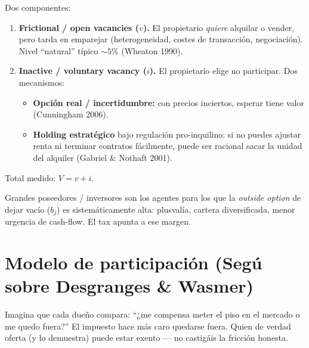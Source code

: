 \documentclass[11pt,a4paper]{report}
\begin{document}
\begin{modelo}[title={Modelo (versi\'on sencilla) --- Seg\'u / Wheaton}]
Dos componentes:
\begin{enumerate}
  \item \textbf{Frictional / open vacancies ($v$).}
        El propietario \emph{quiere} alquilar o vender, pero tarda en emparejar
        (heterogeneidad, costes de transacci\'on, negociaci\'on). Nivel ``natural''
        t\'ipico $\sim 5\%$ (Wheaton 1990).
  \item \textbf{Inactive / voluntary vacancy ($i$).}
        El propietario elige no participar. Dos mecanismos:
        \begin{itemize}
          \item \textbf{Opci\'on real / incertidumbre:} con precios inciertos,
                esperar tiene valor (Cunningham 2006).
          \item \textbf{Holding estrat\'egico} bajo regulaci\'on pro-inquilino:
                si no puedes ajustar renta ni terminar contratos f\'acilmente,
                puede ser racional sacar la unidad del alquiler
                (Gabriel \& Nothaft 2001).
        \end{itemize}
\end{enumerate}
Total medido: $V = v + i$.
\end{modelo}

\begin{resumenbox}
Grandes poseedores / inversores son los agentes para los que la
\emph{outside option} de dejar vac\'io ($b_j$) es sistem\'aticamente alta:
plusval\'ia, cartera diversificada, menor urgencia de cash-flow.
El tax apunta a ese margen.
\end{resumenbox}

\section{Modelo de participaci\'on (Seg\'u sobre Desgranges \& Wasmer)}

\begin{intuicion}
Imagina que cada due\~no compara: ``¿me compensa meter el piso en el mercado
o me quedo fuera?'' El impuesto hace m\'as caro quedarse fuera. Quien de verdad
oferta (y lo demuestra) puede estar exento --- no castig\'ais la fricci\'on honesta.
\end{intuicion}
\end{document}
